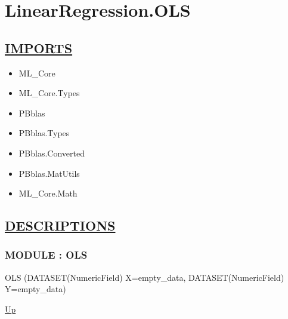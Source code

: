 \chapter*{LinearRegression.OLS}
\hypertarget{ecldoc:toc:LinearRegression.OLS}{}

\section*{\underline{IMPORTS}}
\begin{itemize}
\item ML\_Core
\item ML\_Core.Types
\item PBblas
\item PBblas.Types
\item PBblas.Converted
\item PBblas.MatUtils
\item ML\_Core.Math
\end{itemize}

\section*{\underline{DESCRIPTIONS}}
\subsection*{MODULE : OLS}
\hypertarget{ecldoc:linearregression.ols}{}
\begin{minipage}[t]{\textwidth}
\begin{flushleft}
 OLS (DATASET(NumericField) X=empty\_data, DATASET(NumericField) Y=empty\_data)
\end{flushleft}
\end{minipage}
\hyperlink{ecldoc:toc:LinearRegression}{Up}


